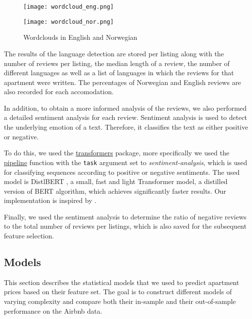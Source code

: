 \begin{figure}[t]
  \centering
  \begin{minipage}{6.7cm}
    \texttt{[image: wordcloud\_eng.png]}
  \end{minipage}
  \begin{minipage}{6.7cm}
    \texttt{[image: wordcloud\_nor.png]}
  \end{minipage}
  \caption{Wordclouds in English and Norwegian}
  \label{fig:wordclouds}
\end{figure}

The results of the language detection are stored per listing along with the number of reviews per listing, the median length of a review, the number of different languages as well as a list of languages in which the reviews for that apartment were written.
The percentages of Norwegian and English reviews are also recorded for each accomodation.

In addition, to obtain a more informed analysis of the reviews, we also performed a detailed sentiment analysis for each review.
Sentiment analysis is used to detect the underlying emotion of a text.
Therefore, it classifies the text as either positive or negative.

To do this, we used the \href{https://huggingface.co/transformers/v3.0.2/model_doc/distilbert.html}{transformers} package, more specifically we used the \href{https://huggingface.co/transformers/v3.0.2/main_classes/pipelines.html}{pipeline} function with the \texttt{task} argument set to \textit{sentiment-analysis}, which is used for classifying sequences according to positive or negative sentiments.
The used model is DistlBERT \citep{sanh2020}, a small, fast and light Transformer model, a distilled version of BERT \citep{devlin2019} algorithm, which achieves significantly faster results.
Our implementation is inspired by \citep{selvaraj2020}.

Finally, we used the sentiment analysis to determine the ratio of negative reviews to the total number of reviews per listings, which is also saved for the subsequent feature selection. 

\subsection{Models}

This section describes the statistical models that we used to predict apartment prices based on their feature set.
The goal is to construct different models of varying complexity and compare both their in-sample and their out-of-sample performance on the Airbnb data.

